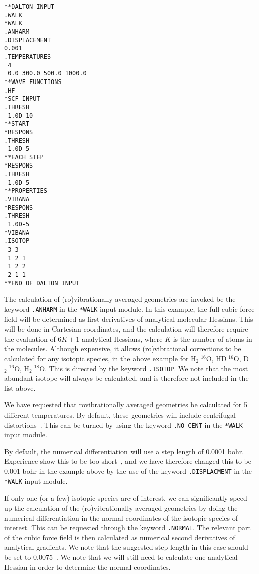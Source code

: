 \begin{verbatim}
**DALTON INPUT
.WALK
*WALK
.ANHARM
.DISPLACEMENT
0.001
.TEMPERATURES
 4
 0.0 300.0 500.0 1000.0
**WAVE FUNCTIONS
.HF
*SCF INPUT
.THRESH
 1.0D-10
**START
*RESPONS
.THRESH
 1.0D-5
**EACH STEP
*RESPONS
.THRESH
 1.0D-5
**PROPERTIES
.VIBANA
*RESPONS
.THRESH
 1.0D-5
*VIBANA
.ISOTOP
 3 3
 1 2 1
 1 2 2
 2 1 1
**END OF DALTON INPUT
\end{verbatim}

The calculation of (ro)vibrationally averaged geometries are invoked
be the keyword \verb|.ANHARM| in the \verb|*WALK| input module. In
this example, the full cubic force field will be determined as 
first derivatives of analytical molecular Hessians. This will be done
in Cartesian coordinates, and the calculation will therefore require
the evaluation of $6K + 1$ analytical Hessians, where $K$ is the
number of atoms in the molecules. Although expensive, it allows
 (ro)vibrational corrections to be calculated for any isotopic
species, in the above 
example for H$_2\;^{16}$O, HD$\;^{16}$O, D$_2\;^{16}$O,
H$_2\;^{18}$O. This is directed by the keyword \verb|.ISOTOP|. We
note that the most abundant isotope will always be calculated, and is
therefore not included in the list above.

We have requested that rovibrationally averaged geometries be
calculated for 5 different temperatures. By default, these geometries
will include centrifugal distortions~\cite{krjljv}. This can be
turned by using the keyword \verb|.NO CENT| in the \verb|*WALK| input
module.

By default, the numerical differentiation will use a step length of
0.0001 bohr. Experience show this to be too short~\cite{poakrprtjcp112}, and we have
therefore changed this to be 0.001 bohr in the example above by the
use of the keyword \verb|.DISPLACMENT| in the \verb|*WALK| input
module.

If only one (or a few) isotopic species are of interest, we can significantly
speed up the calculation of the (ro)vibrationally averaged geometries
by doing the numerical differentiation in the normal coordinates of
the isotopic species of interest. This can be requested through the
keyword \verb|.NORMAL|. The relevant part of the cubic force field is
then calculated as numerical second derivatives of analytical
gradients. We note that the suggested step length in this case should
be set to 0.0075~\cite{poakrprtjcp112}. We note that we will still need to calculate one
analytical Hessian in order to determine the normal coordinates.

